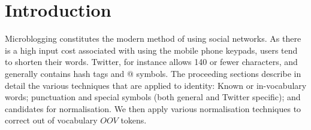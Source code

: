 \section{Introduction}
\label{sec-intro}

Microblogging constitutes the modern method of using social networks. As there is a high input cost associated with using the mobile phone keypads, users tend to shorten their words. 
Twitter, for instance allows 140 or fewer characters, and generally contains hash tags and @ symbols. The proceeding sections describe in detail the various techniques that are applied to
identity: {Known} or {in-vocabulary} words; punctuation and special symbols (both general and Twitter specific); and candidates for normalisation. 
We then apply various normalisation techniques to correct out of vocabulary $OOV$ tokens.









